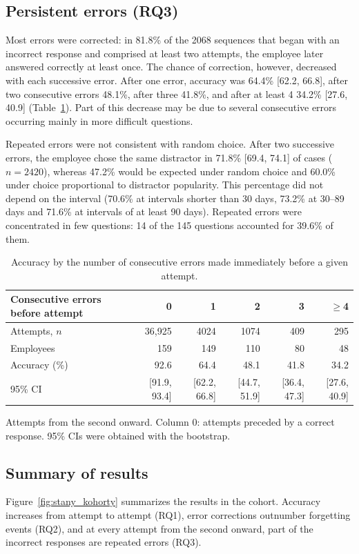 \documentclass[preprint,12pt,authoryear]{elsarticle}
\newcommand{\uwagatabeli}[1]{\par\vspace{2pt}\parbox{\linewidth}{\footnotesize #1}}
\begin{document}
\subsection{Persistent errors (RQ3)}
\label{sec:pb3}
Most errors were corrected: in 81.8\% of the 2068 sequences that began with
an incorrect response and comprised at least two attempts, the employee later answered correctly at
least once. The chance of correction, however, decreased with each successive error. After one error,
accuracy was 64.4\% [62.2, 66.8], after two consecutive errors 48.1\%, after three
41.8\%, and after at least 4 34.2\% [27.6, 40.9]
(Table~\ref{tab:seria_bledow}). Part of this decrease may be due to several consecutive errors
occurring mainly in more difficult questions.

Repeated errors were not consistent with random choice. After two successive errors, the employee
chose the same distractor in 71.8\% [69.4, 74.1] of cases
($n = 2420$), whereas 47.2\% would be expected under random choice and
60.0\% under choice proportional to distractor popularity. This percentage did
not depend on the interval (70.6\% at intervals shorter than 30 days,
73.2\% at 30--89 days and 71.6\% at intervals of at least 90 days). Repeated errors were
concentrated in few questions: 14 of the 145 questions accounted for
39.6\% of them.

\begin{table}[H]
\centering
\caption{Accuracy by the number of consecutive errors made immediately before a given attempt.}
\label{tab:seria_bledow}
\footnotesize
\setlength{\tabcolsep}{5pt}
\begin{tabular}{l*{5}{r}}
\toprule
Consecutive errors before attempt & 0 & 1 & 2 & 3 & $\geq$4 \\
\midrule
Attempts, $n$ & 36{,}925 & 4024 & 1074 & 409 & 295 \\
Employees & 159 & 149 & 110 & 80 & 48 \\
Accuracy (\%) & 92.6 & 64.4 & 48.1 & 41.8 & 34.2 \\
95\% CI & [91.9, 93.4] & [62.2, 66.8] & [44.7, 51.9] & [36.4, 47.3] & [27.6, 40.9] \\
\bottomrule
\end{tabular}%
\uwagatabeli{Attempts from the second onward. Column 0: attempts preceded by a correct response.
95\% CIs were obtained with the bootstrap.}
\end{table}

\subsection{Summary of results}
Figure~\ref{fig:stany_kohorty} summarizes the results in the cohort. Accuracy increases from attempt
to attempt (RQ1), error corrections outnumber forgetting events (RQ2), and at every attempt from the
second onward, part of the incorrect responses are repeated errors (RQ3).
\end{document}
